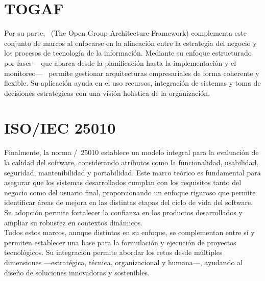 \section{TOGAF}
\noindent
Por su parte, \TOGAF\ (The Open Group Architecture Framework) complementa este conjunto de marcos al enfocarse en la alineación entre la estrategia del negocio y los procesos de tecnología de la información. Mediante su enfoque estructurado por fases —que abarca desde la planificación hasta la implementación y el monitoreo— \TOGAF\ permite gestionar arquitecturas empresariales de forma coherente y flexible. Su aplicación ayuda en el uso recursos, integración de sistemas y toma de decisiones estratégicas con una visión holística de la organización\citep{Mumtaza2025}.

\section{ISO/IEC 25010}
\noindent
Finalmente, la norma \ISO/\IEC\ 25010 establece un modelo integral para la evaluación de la calidad del software, considerando atributos como la funcionalidad, usabilidad, seguridad, mantenibilidad y portabilidad\citep{ISO25010}. Este marco teórico es fundamental para asegurar que los sistemas desarrollados cumplan con los requisitos tanto del negocio como del usuario final, proporcionando un enfoque riguroso que permite identificar áreas de mejora en las distintas etapas del ciclo de vida del software. Su adopción permite fortalecer la confianza en los productos desarrollados y ampliar su robustez en contextos dinámicos.\\
\noindent
Todos estos marcos, aunque distintos en su enfoque, se complementan entre sí y permiten establecer una base para la formulación y ejecución de proyectos tecnológicos. Su integración permite abordar los retos desde múltiples dimensiones —estratégica, técnica, organizacional y humana—, ayudando al diseño de soluciones innovadoras y sostenibles.